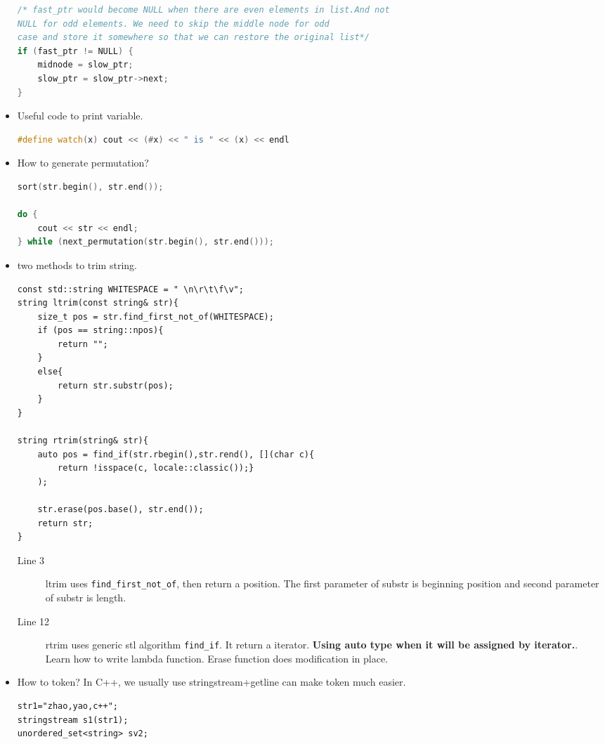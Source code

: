 \documentclass[a4paper,11pt,twoside]{book}
\begin{document}
\begin{itemize}
\begin{lstlisting}[frame=single, language=c++]
/* fast_ptr would become NULL when there are even elements in list.And not 
NULL for odd elements. We need to skip the middle node for odd 
case and store it somewhere so that we can restore the original list*/
if (fast_ptr != NULL) {
	midnode = slow_ptr;
	slow_ptr = slow_ptr->next;
}
\end{lstlisting}	


	\item Useful code to print variable. 
\begin{lstlisting}[frame=single, language=c++]
	#define watch(x) cout << (#x) << " is " << (x) << endl
\end{lstlisting}
	
	\item How to generate permutation?
\begin{lstlisting}[frame=single, language=c++]
sort(str.begin(), str.end());

do {
	cout << str << endl;
} while (next_permutation(str.begin(), str.end()));	
\end{lstlisting}	

	\item two methods to trim string.

\begin{lstlisting}[]
const std::string WHITESPACE = " \n\r\t\f\v";
string ltrim(const string& str){
	size_t pos = str.find_first_not_of(WHITESPACE);
	if (pos == string::npos){
		return "";
	}
	else{
		return str.substr(pos);
	}
}

string rtrim(string& str){
	auto pos = find_if(str.rbegin(),str.rend(), [](char c){ 
		return !isspace(c, locale::classic());}
	);
	
	str.erase(pos.base(), str.end());
	return str;
}
\end{lstlisting}
\begin{description}
	\item[Line 3] ltrim uses \texttt{find\_first\_not\_of}, then return a position. The first parameter of substr is beginning position and second parameter of substr is length. 
	
	\item[Line 12] rtrim uses generic stl algorithm \texttt{find\_if}. It return a iterator. \textbf{Using auto type when it will be assigned by iterator.}. Learn how to write lambda function.  Erase function does modification in place. 
\end{description}

\item How to token? In C++, we usually use stringstream+getline can make token much easier.
\begin{lstlisting}[numbers=none]
str1="zhao,yao,c++";
stringstream s1(str1);
unordered_set<string> sv2;


\end{lstlisting}
\end{itemize}
\end{document}
